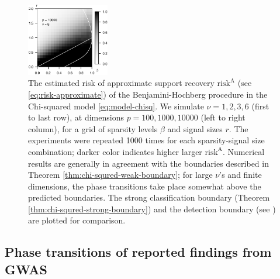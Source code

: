 \begin{figure}
      \includegraphics[width=0.32\textwidth]{./sim_weak_boundary/simulated_weak_boundary_chi-squared_nu6_p10000.eps}
      \caption{The estimated risk of approximate support recovery $\mathrm{risk}^{\mathrm{A}}$ (see \eqref{eq:risk-approximate}) of the Benjamini-Hochberg procedure in the Chi-squared model \eqref{eq:model-chisq}. 
      We simulate $\nu=1, 2, 3, 6$ (first to last row), at dimensions $p=100, 1000, 10000$ (left to right column), for a grid of sparsity levels $\beta$ and signal sizes $r$.
      The experiments were repeated 1000 times for each sparsity-signal size combination; darker color indicates higher larger $\mathrm{risk}^{\mathrm{A}}$. 
      Numerical results are generally in agreement with the boundaries described in Theorem \ref{thm:chi-squred-weak-boundary}; for large $\nu$'s and finite dimensions, the phase transitions take place somewhat above the predicted boundaries.
      The strong classification boundary (Theorem \ref{thm:chi-squred-strong-boundary}) and the detection boundary (see \citep{donoho2004higher}) are plotted for comparison.} 
      \label{fig:phase-simulated-chi-squared-weak-boundary}
\end{figure}

\subsection{Phase transitions of reported findings from GWAS}